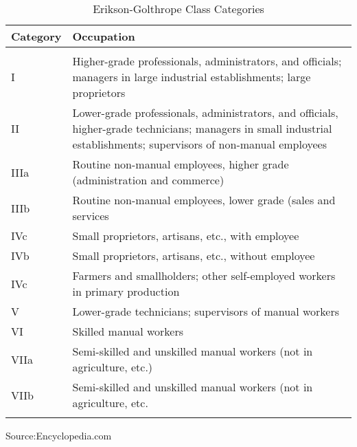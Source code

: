 \documentclass[11pt, a4paper, leqno]{article}
\begin{document}
\newpage
\begin{table}[h!]
\centering
\caption{Erikson-Golthrope Class Categories }
\vspace{1mm}
\label{Table:A2}
\begin{tabular}{ ||p{2cm}|p{12cm}||  }
 \hline
 Category    & \hspace{9mm} Occupation   \\
 \hline
 &\\
 I &Higher-grade professionals, administrators, and officials; managers in large industrial establishments; large proprietors  \\
 \hline

 II &Lower-grade professionals, administrators, and officials, higher-grade technicians; managers in small industrial establishments; supervisors of non-manual employees\\

 \hline

 IIIa &Routine non-manual employees, higher grade (administration and commerce)\\

 \hline

 IIIb& Routine non-manual employees, lower grade (sales and services \\
 
 \hline

IVc &Small proprietors, artisans, etc., with employee \\
 
 \hline

 IVb &Small proprietors, artisans, etc., without employee  \\

\hline

IVc& Farmers and smallholders; other self-employed workers in primary production\\

\hline

V& Lower-grade technicians; supervisors of manual workers\\

\hline

VI& Skilled manual workers\\

\hline

VIIa&Semi-skilled and unskilled manual workers (not in agriculture, etc.) \\

\hline

VIIb&Semi-skilled and unskilled manual workers (not in agriculture, etc. \\
&\\
 \hline
\end{tabular}
\end{table}
\footnotesize{Source:Encyclopedia.com}



\end{document}
